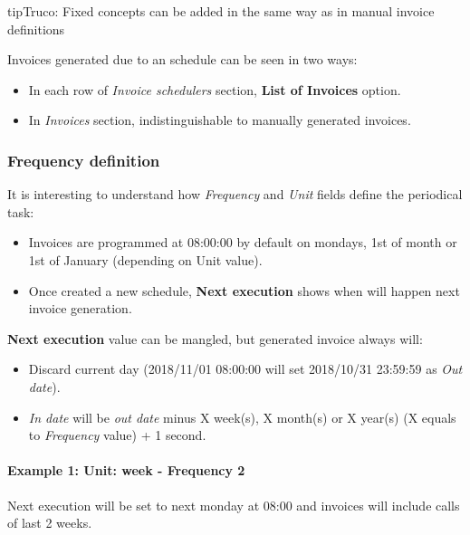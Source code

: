 \documentclass[letterpaper,10pt,spanish]{sphinxmanual}
\begin{document}
\begin{notice}{tip}{Truco:}
Fixed concepts can be added in the same way as in manual invoice definitions
\end{notice}

Invoices generated due to an schedule can be seen in two ways:
\begin{itemize}
\item {} 
In each row of \emph{Invoice schedulers} section, \textbf{List of Invoices} option.

\item {} 
In \emph{Invoices} section, indistinguishable to manually generated invoices.

\end{itemize}


\subsubsection{Frequency definition}
\label{administration_portal/brand/invoicing/invoice_schedulers:frequency-definition}
It is interesting to understand how \emph{Frequency} and \emph{Unit} fields define the periodical task:
\begin{itemize}
\item {} 
Invoices are programmed at 08:00:00 by default on mondays, 1st of month or 1st of January (depending on Unit value).

\item {} 
Once created a new schedule, \textbf{Next execution} shows when will happen next invoice generation.

\end{itemize}

\textbf{Next execution} value can be mangled, but generated invoice always will:
\begin{itemize}
\item {} 
Discard current day (2018/11/01 08:00:00 will set 2018/10/31 23:59:59 as \emph{Out date}).

\item {} 
\emph{In date} will be \emph{out date} minus X week(s), X month(s) or X year(s) (X equals to \emph{Frequency} value) + 1 second.

\end{itemize}
\paragraph{Example 1: Unit: week - Frequency 2}

Next execution will be set to next monday at 08:00 and invoices will include calls of last 2 weeks.
\end{document}

